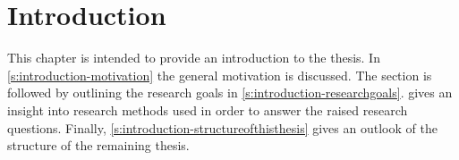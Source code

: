 
\chapter{Introduction}
\label{c:introduction}

This chapter is intended to provide an introduction to the thesis.
In \cref{s:introduction-motivation} the general motivation is discussed.
The section is followed by outlining the research goals in \cref{s:introduction-researchgoals}.
 gives an insight into research methods used in order to answer the raised research questions.
Finally, \cref{s:introduction-structureofthisthesis} gives an outlook of the structure of the remaining thesis.

